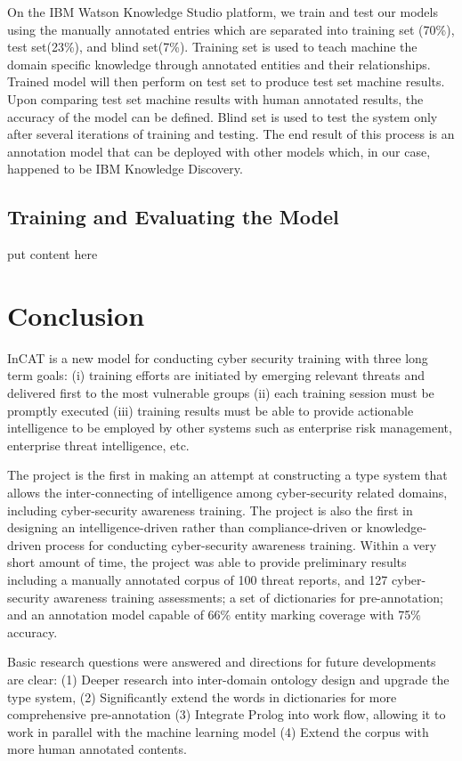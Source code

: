 \documentclass{article} %
\begin{document}
On the IBM Watson Knowledge Studio platform, we train and test our models using the manually annotated entries which are separated into training set (70\%), test set(23\%), and blind set(7\%). Training set is used to teach machine the domain specific knowledge through annotated entities and their relationships. Trained model will then perform on test set to produce test set machine results. Upon comparing test set machine results with human annotated results, the accuracy of the model can be defined. Blind set is used to test the system only after several iterations of training and testing. The end result of this process is an annotation model that can be deployed with other models which, in our case, happened to be IBM Knowledge Discovery.

\subsection{Training and Evaluating the Model}
put content here

\section{Conclusion}
InCAT is a new model for conducting cyber security training with three long term goals: (i) training efforts are initiated by emerging relevant threats and delivered first to the most vulnerable groups (ii) each training session must be promptly executed (iii) training results must be able to provide actionable intelligence to be employed by other systems such as enterprise risk management, enterprise threat intelligence, etc.

The project is the first in making an attempt at constructing a type system that allows the inter-connecting of intelligence among cyber-security related domains, including cyber-security awareness training. The project is also the first in designing an intelligence-driven rather than compliance-driven or knowledge-driven process for conducting cyber-security awareness training. Within a very short amount of time, the project was able to provide preliminary results including a manually annotated corpus of 100 threat reports, and 127 cyber-security awareness training assessments; a set of dictionaries for pre-annotation; and an annotation model capable of 66\% entity marking coverage with 75\% accuracy.

Basic research questions were answered and directions for future developments are clear: (1) Deeper research into inter-domain ontology design and upgrade the type system, (2) Significantly extend the words in dictionaries for more comprehensive pre-annotation (3) Integrate Prolog into work flow, allowing it to work in parallel with the machine learning model (4) Extend the corpus with more human annotated contents.



\end{document}
